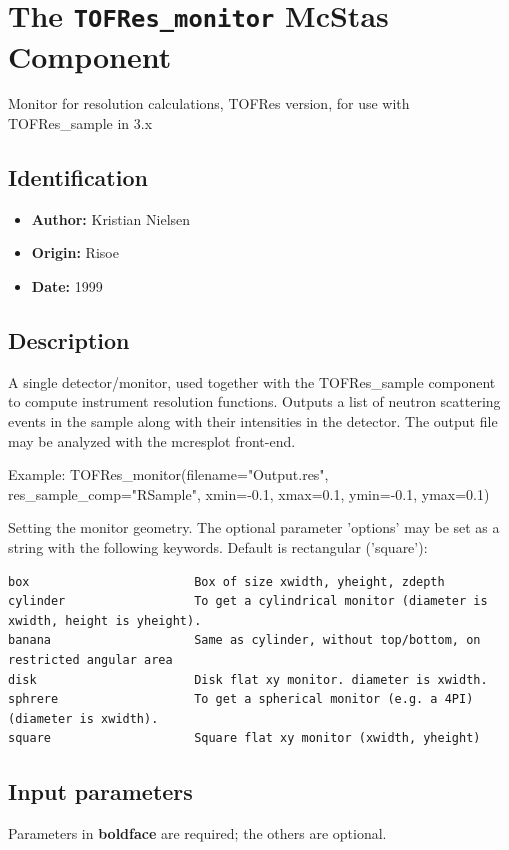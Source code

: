 \section{The \texttt{TOFRes\_monitor} McStas Component}
Monitor for resolution calculations, TOFRes version, for use with TOFRes\_sample in 3.x

\subsection*{Identification}
\begin{itemize}
  \item \textbf{Author:} Kristian Nielsen
  \item \textbf{Origin:} Risoe
  \item \textbf{Date:} 1999
\end{itemize}

\subsection*{Description}
A single detector/monitor, used together with the TOFRes\_sample component to compute instrument resolution functions. Outputs a list of neutron scattering events in the sample along with their intensities in the detector. The output file may be analyzed with the mcresplot front-end.

Example: TOFRes\_monitor(filename="Output.res", res\_sample\_comp="RSample", xmin=-0.1, xmax=0.1, ymin=-0.1, ymax=0.1)

Setting the monitor geometry. The optional parameter 'options' may be set as a string with the following keywords. Default is rectangular ('square'):

\begin{verbatim}
box                       Box of size xwidth, yheight, zdepth
cylinder                  To get a cylindrical monitor (diameter is xwidth, height is yheight).
banana                    Same as cylinder, without top/bottom, on restricted angular area
disk                      Disk flat xy monitor. diameter is xwidth.
sphrere                   To get a spherical monitor (e.g. a 4PI) (diameter is xwidth).
square                    Square flat xy monitor (xwidth, yheight)
\end{verbatim}

\subsection*{Input parameters}
Parameters in \textbf{boldface} are required; the others are optional.

